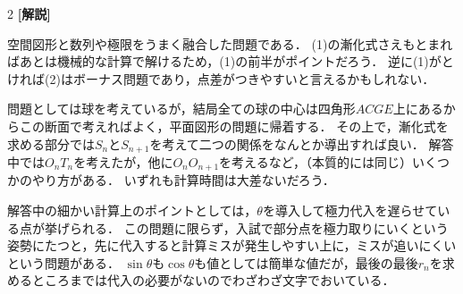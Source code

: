 \documentclass[../../main.tex]{subfiles}
\begin{document}
\begin{multicols}{2}
  {\bf[解説]}

  空間図形と数列や極限をうまく融合した問題である．
  (1)の漸化式さえもとまればあとは機械的な計算で解けるため，(1)の前半がポイントだろう．
  逆に(1)がとければ(2)はボーナス問題であり，点差がつきやすいと言えるかもしれない．

  問題としては球を考えているが，結局全ての球の中心は四角形$ACGE$上にあるからこの断面で考えればよく，平面図形の問題に帰着する．
  その上で，漸化式を求める部分では$S_n$と$S_{n+1}$を考えて二つの関係をなんとか導出すれば良い．
  解答中では$O_nT_n$を考えたが，他に$O_nO_{n+1}$を考えるなど，（本質的には同じ）いくつかのやり方がある．
  いずれも計算時間は大差ないだろう．

  解答中の細かい計算上のポイントとしては，$\theta$を導入して極力代入を遅らせている点が挙げられる．
  この問題に限らず，入試で部分点を極力取りにいくという姿勢にたつと，先に代入すると計算ミスが発生しやすい上に，ミスが追いにくいという問題がある．
  $\sin\theta$も$\cos\theta$も値としては簡単な値だが，最後の最後$r_n$を求めるところまでは代入の必要がないのでわざわざ文字でおいている．




  \newpage
\end{multicols}
\end{document}
